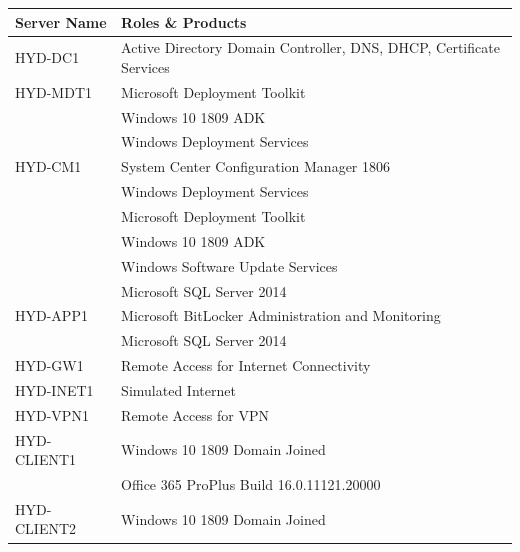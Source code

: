 \begin{table}[ht]
	\centering
	\begin{adjustbox}{width=1\textwidth}
	\begin{tabular}{l|l}
		Server Name  & Roles \& Products                                                  	 \\ 
		\hline
		HYD-DC1      & Active Directory Domain Controller, DNS, DHCP, Certificate Services 	   \\
		HYD-MDT1     & Microsoft Deployment Toolkit                                        		\\
		& Windows 10 1809 ADK                                                 					 \\
		& Windows Deployment Services                                         					  \\
		HYD-CM1      & System Center Configuration Manager 1806                            		   \\
		& Windows Deployment Services                                         						\\
		& Microsoft Deployment Toolkit                                         						 \\
		& Windows 10 1809 ADK                                                 			 			  \\
		& Windows Software Update Services                                        		  			   \\
		& Microsoft SQL Server 2014                                           						    \\
		HYD-APP1     & Microsoft BitLocker Administration and Monitoring                   				 \\
		& Microsoft SQL Server 2014                                          							  \\
		HYD-GW1      & Remote Access for Internet Connectivity                           				   \\
		HYD-INET1    & Simulated Internet                                                			 	    \\
		HYD-VPN1     & Remote Access for VPN                                             				     \\
		HYD-CLIENT1  & Windows 10 1809 Domain Joined                                  					      \\
		& Office 365 ProPlus Build 16.0.11121.20000                         								   \\
		HYD-CLIENT2  & Windows 10 1809 Domain Joined                                     					    \\

\end{tabular}
\end{adjustbox}
\end{table}
